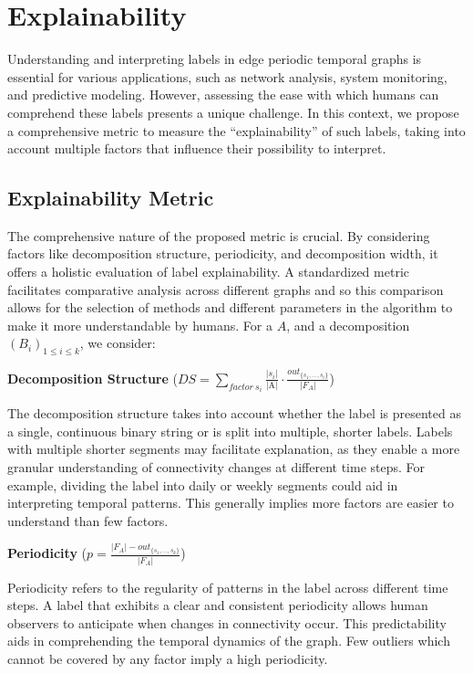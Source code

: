 \chapter{Explainability}

Understanding and interpreting labels in edge periodic temporal graphs is essential for various applications, such as network analysis, system monitoring, and predictive modeling. However, assessing the ease with which humans can comprehend these labels presents a unique challenge. In this context, we propose a comprehensive metric to measure the \enquote{explainability} of such labels, taking into account multiple factors that influence their possibility to interpret.

\section{Explainability Metric}
The comprehensive nature of the proposed metric is crucial. By considering factors like decomposition structure, periodicity, and decomposition width, it offers a holistic evaluation of label explainability. A standardized metric facilitates comparative analysis across different graphs and so this comparison allows for the selection of methods and different parameters in the algorithm to make it more understandable by humans. For a \DFA $A$, and a decomposition $(B_i)_{1 \leq i \leq k}$, we consider:

\textbf{Decomposition Structure} ($DS = \sum\limits_{factor~ s_i}\frac{|s_i|}{\text{|A|}} \cdot \frac{out_{\{s_1,\dots,s_i\}}}{|F_A|}$)

The decomposition structure takes into account whether the label is presented as a single, continuous binary string or is split into multiple, shorter labels. Labels with multiple shorter segments may facilitate explanation, as they enable a more granular understanding of connectivity changes at different time steps. For example, dividing the label into daily or weekly segments could aid in interpreting temporal patterns. This generally implies more factors are easier to understand than few factors.

\textbf{Periodicity} ($p = \frac{|F_A| - out_{\{s_1,\dots,s_k\}}}{|F_A|}$)

Periodicity refers to the regularity of patterns in the label across different time steps. A label that exhibits a clear and consistent periodicity allows human observers to anticipate when changes in connectivity occur. This predictability aids in comprehending the temporal dynamics of the graph. Few outliers which cannot be covered by any factor imply a high periodicity.

